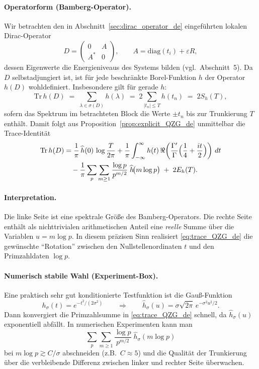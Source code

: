 \documentclass[11pt,a4paper]{article}
\theoremstyle{definition}
\begin{document}
\paragraph{Operatorform (Bamberg-Operator).}
Wir betrachten den in Abschnitt~\ref{sec:dirac_operator_de} eingeführten lokalen Dirac-Operator
\[
D=\begin{pmatrix}0&A\\A^\ast&0\end{pmatrix},
\qquad
A=\mathrm{diag}(t_i)+\varepsilon R,
\]
dessen Eigenwerte die Energieniveaus des Systems bilden (vgl.\ Abschnitt~5). Da $D$ selbstadjungiert ist,
ist für jede beschränkte Borel-Funktion $h$ der Operator $h(D)$ wohldefiniert.
Insbesondere gilt für gerade $h$:
\[
\mathrm{Tr}\,h(D)\;=\;\sum_{\lambda\in\sigma(D)} h(\lambda)\;=\;2\sum_{|t_n|\le T} h(t_n)\;=\;2S_h(T),
\]
sofern das Spektrum im betrachteten Block die Werte $\pm t_n$ bis zur Trunkierung $T$ enthält.
Damit folgt aus Proposition~\ref{prop:explicit_QZG_de} unmittelbar die Trace-Identität
\begin{align}
\mathrm{Tr}\,h(D)
&=\frac{1}{\pi}\,\widehat h(0)\,\log\frac{T}{2\pi}
+\frac{1}{\pi}\int_{-\infty}^{\infty} h(t)\,
\Re\!\left(\frac{\Gamma'}{\Gamma}\Bigl(\frac14+\frac{it}{2}\Bigr)\right)\,dt \notag\\
&\quad-\frac{1}{\pi}\sum_{p}\sum_{m\ge 1}\frac{\log p}{p^{m/2}}\;\widehat h\!\bigl(m\log p\bigr)
\;+\;2E_h(T).
\label{eq:trace_QZG_de}
\end{align}

\paragraph{Interpretation.}
Die linke Seite ist eine spektrale Größe des Bamberg-Operators.
Die rechte Seite enthält als nichttrivialen arithmetischen Anteil eine \emph{reelle} Summe
über die Variablen $u=m\log p$. In diesem präzisen Sinn realisiert \eqref{eq:trace_QZG_de}
die gewünschte ``Rotation'' zwischen den Nullstellenordinaten $t$ und den Primzahldaten $\log p$.

\paragraph{Numerisch stabile Wahl (Experiment-Box).}
Eine praktisch sehr gut konditionierte Testfunktion ist die Gauß-Funktion
\[
h_\sigma(t)=e^{-t^2/(2\sigma^2)}
\qquad\Longrightarrow\qquad
\widehat h_\sigma(u)=\sigma\sqrt{2\pi}\,e^{-\sigma^2u^2/2}.
\]
Dann konvergiert die Primzahlsumme in \eqref{eq:trace_QZG_de} schnell,
da $\widehat h_\sigma(u)$ exponentiell abfällt. In numerischen Experimenten kann man
\[
\sum_{p}\sum_{m\ge 1}\frac{\log p}{p^{m/2}}\;\widehat h_\sigma(m\log p)
\]
bei $m\log p \gtrsim C/\sigma$ abschneiden (z.B.\ $C\approx 5$) und die Qualität der Trunkierung
über die verbleibende Differenz zwischen linker und rechter Seite überwachen.
\end{document}
